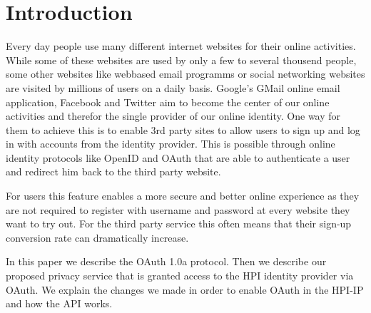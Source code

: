 \section{Introduction }
\label{sec:intro}

Every day people use many different internet websites for their online activities. While some of these websites are used by only a few to several thousend people, some other websites like webbased email programms or social networking websites are visited by millions of users on a daily basis. Google's GMail online email application, Facebook and Twitter aim to become the center of our online activities and therefor the single provider of our online identity. One way for them to achieve this is to enable 3rd party sites to allow users to sign up and log in with accounts from the identity provider. This is possible through online identity protocols like OpenID and OAuth that are able to authenticate a user and redirect him back to the third party website.

For users this feature enables a more secure and better online experience as they are not required to register with username and password at every website they want to try out. For the third party service this often means that their sign-up conversion rate can dramatically increase.

In this paper we describe the OAuth 1.0a protocol. Then we describe our proposed privacy service that is granted access to the HPI identity provider via OAuth. We explain the changes we made in order to enable OAuth in the HPI-IP and how the API works.

